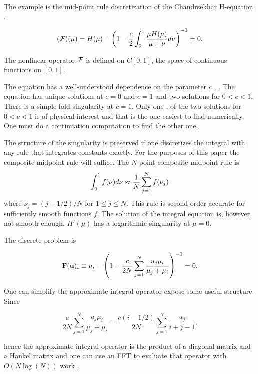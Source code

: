 \documentclass[11pt]{article}
\begin{document}
The example is the mid-point rule discretization of the Chandrsekhar
H-equation \cite{chand}.

\begin{equation}
    ({{\cal F}})(\mu) = H(\mu) -
\left(
1 - \frac{c}{2} \int_0^1 \frac{\mu H(\mu)}{\mu + \nu} d \nu
\right)^{-1} = 0.
    \end{equation}

The nonlinear operator \({\cal F}\) is defined on \(C[0,1]\), the space of
continuous functions on \([0,1]\).

The equation has a well-understood dependence on the parameter \(c\)
\cite{twm68}, \cite{ctk:n1}. The equation has unique solutions at
\(c=0\) and \(c=1\) and two solutions for \(0 < c < 1\). There is a
simple fold singularity \cite{herb} at \(c=1\). Only one \cite{chand},
\cite{busb} of the two solutions for \(0 < c < 1\) is of physical
interest and that is the one easiest to find numerically. One must do a
continuation computation to find the other one.

The structure of the singularity is preserved if one discretizes the
integral with any rule that integrates constants exactly. For the
purposes of this paper the composite midpoint rule will suffice. The
\(N\)-point composite midpoint rule is \begin{equation}
\int_0^1 f(\nu) d \nu \approx \frac{1}{N} \sum_{j=1}^N f(\nu_j)
\end{equation} where \(\nu_j = (j - 1/2)/N\) for \(1 \le j \le N\). This
rule is second-order accurate for sufficiently smooth functions \(f\).
The solution of the integral equation is, however, not smooth enough.
\(H'(\mu)\) has a logarithmic singularity at \(\mu=0\).

The discrete problem is

\begin{equation}
{\bf F}({\bf u})_i \equiv
u_i - \left(
1  - \frac{c}{2N} \sum_{j=1}^N \frac{u_j \mu_i}{\mu_j + \mu_i}
\right)^{-1}
=0.
\end{equation}

One can simplify the approximate integral operator 
expose some useful structure. Since

\begin{equation}
\frac{c}{2N} \sum_{j=1}^N \frac{u_j \mu_i}{\mu_j + \mu_i}
= \frac{c (i - 1/2) }{2N} \sum_{j=1}^N \frac{u_j}{i+j -1}.
\end{equation}

hence the approximate integral operator is the product of a diagonal
matrix and a Hankel matrix and one can use an FFT to evaluate that
operator with \(O(N \log(N))\) work \cite{golub}.
\end{document}

